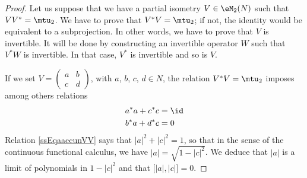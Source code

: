 \begin{proof}
	Let us suppose that we have a partial isometry $V\in\eM_2(N)$ such that $VV^*=\mtu_2$. We have to prove that $V^*V=\mtu_2$; if not, the identity would be equivalent to a subprojection. In other words, we have to prove that $V$ is invertible. It will be done by constructing an invertible operator $W$ such that $V^*W$ is invertible. In that case, $V^*$ is invertible and so is $V$.

	If we set $V=
		\begin{pmatrix}
			a & b \\
			c & d
		\end{pmatrix}$, with $a$, $b$, $c$, $d\in N$, the relation $V^*V=\mtu_2$ imposes among others relations
	\begin{subequations}	\label{SubEassEqaaccunVV}
		\begin{align}
			a^*a+c^*c & =\id		\label{ssEqaaccunVV} \\
			b^*a+d^*c & =0		\label{ssEqbadczVV}
		\end{align}
	\end{subequations}
	Relation \eqref{ssEqaaccunVV} says that $| a |^2+| c |^2=1$, so that in the sense of the continuous functional calculus, we have $| a |=\sqrt{1-| c |^2}$. We deduce that $| a |$ is a limit of polynomials in $1-| c |^2$ and that $\big[ | a |,| c | \big]=0$.


\end{proof}
